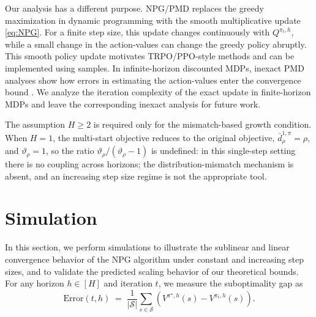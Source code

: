 \documentclass[11pt]{article}
\begin{document}
Our analysis has a different purpose. NPG/PMD replaces the greedy
maximization in dynamic programming with the smooth multiplicative update
\eqref{eq:NPG}. For a finite step size, this update changes continuously with
$Q^{\pi_t,h}$, while a small change in the action-values can change the greedy
policy abruptly. This smooth policy update motivates TRPO/PPO-style methods
and can be implemented using samples. In infinite-horizon discounted MDPs,
inexact PMD analyses show how errors in estimating the action-values enter
the convergence bound \citep{lan2023policy,xiao2022convergence}. We analyze
the iteration complexity of the exact update in finite-horizon MDPs and leave
the corresponding inexact analysis for future work.

The assumption $H\ge2$ is required only for the mismatch-based growth
condition. When $H=1$, the multi-start objective reduces to the original
objective, $\bar d^{1,\pi}_\rho=\rho$, and $\vartheta_\rho=1$, so the ratio
$\vartheta_\rho/(\vartheta_\rho-1)$ is undefined: in this single-step setting
there is no coupling across horizons; the distribution-mismatch mechanism is
absent, and an increasing step size regime is not the appropriate tool.

\section{Simulation} \label{sec:Simulation}
In this section, we perform simulations to illustrate the sublinear and linear convergence behavior of the NPG algorithm under constant and increasing step sizes, and to validate the predicted scaling behavior of our theoretical bounds. For any horizon $h\in[H]$ and iteration $t$, we measure the suboptimality gap as
\[
\text{Error}(t,h) \;=\; \frac{1}{|\mathcal S|}\sum_{s \in \mathcal{S}} \left( V^{\pi^\star,h}(s) - V^{\pi_t,h}(s) \right).
\]
\end{document}

